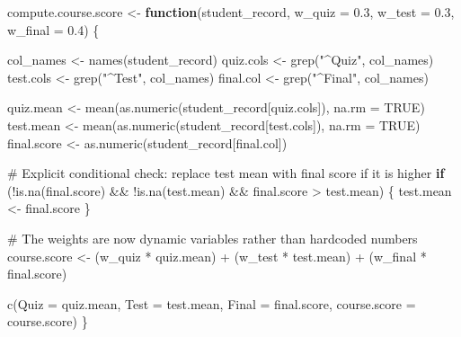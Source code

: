 \documentclass[
  letterpaper,
  DIV=11,
  numbers=noendperiod]{scrreprt}
\newenvironment{Shaded}{\begin{snugshade}}{\end{snugshade}}
\newcommand{\AttributeTok}[1]{\textcolor[rgb]{0.40,0.45,0.13}{#1}}
\newcommand{\CommentTok}[1]{\textcolor[rgb]{0.37,0.37,0.37}{#1}}
\newcommand{\ConstantTok}[1]{\textcolor[rgb]{0.56,0.35,0.01}{#1}}
\newcommand{\ControlFlowTok}[1]{\textcolor[rgb]{0.00,0.23,0.31}{\textbf{#1}}}
\newcommand{\FloatTok}[1]{\textcolor[rgb]{0.68,0.00,0.00}{#1}}
\newcommand{\FunctionTok}[1]{\textcolor[rgb]{0.28,0.35,0.67}{#1}}
\newcommand{\NormalTok}[1]{\textcolor[rgb]{0.00,0.23,0.31}{#1}}
\newcommand{\OtherTok}[1]{\textcolor[rgb]{0.00,0.23,0.31}{#1}}
\newcommand{\SpecialCharTok}[1]{\textcolor[rgb]{0.37,0.37,0.37}{#1}}
\newcommand{\StringTok}[1]{\textcolor[rgb]{0.13,0.47,0.30}{#1}}
\begin{document}
\begin{Shaded}
\begin{Highlighting}[]
\NormalTok{compute.course.score }\OtherTok{\textless{}{-}} \ControlFlowTok{function}\NormalTok{(student\_record, }\AttributeTok{w\_quiz =} \FloatTok{0.3}\NormalTok{, }\AttributeTok{w\_test =} \FloatTok{0.3}\NormalTok{, }\AttributeTok{w\_final =} \FloatTok{0.4}\NormalTok{) \{}
    
\NormalTok{    col\_names }\OtherTok{\textless{}{-}} \FunctionTok{names}\NormalTok{(student\_record)}
\NormalTok{    quiz.cols }\OtherTok{\textless{}{-}} \FunctionTok{grep}\NormalTok{(}\StringTok{"\^{}Quiz"}\NormalTok{, col\_names)}
\NormalTok{    test.cols }\OtherTok{\textless{}{-}} \FunctionTok{grep}\NormalTok{(}\StringTok{"\^{}Test"}\NormalTok{, col\_names)}
\NormalTok{    final.col }\OtherTok{\textless{}{-}} \FunctionTok{grep}\NormalTok{(}\StringTok{"\^{}Final"}\NormalTok{, col\_names)}
    
\NormalTok{    quiz.mean }\OtherTok{\textless{}{-}} \FunctionTok{mean}\NormalTok{(}\FunctionTok{as.numeric}\NormalTok{(student\_record[quiz.cols]), }\AttributeTok{na.rm =} \ConstantTok{TRUE}\NormalTok{)}
\NormalTok{    test.mean }\OtherTok{\textless{}{-}} \FunctionTok{mean}\NormalTok{(}\FunctionTok{as.numeric}\NormalTok{(student\_record[test.cols]), }\AttributeTok{na.rm =} \ConstantTok{TRUE}\NormalTok{)}
\NormalTok{    final.score }\OtherTok{\textless{}{-}} \FunctionTok{as.numeric}\NormalTok{(student\_record[final.col])}
    
    \CommentTok{\# Explicit conditional check: replace test mean with final score if it is higher}
    \ControlFlowTok{if}\NormalTok{ (}\SpecialCharTok{!}\FunctionTok{is.na}\NormalTok{(final.score) }\SpecialCharTok{\&\&} \SpecialCharTok{!}\FunctionTok{is.na}\NormalTok{(test.mean) }\SpecialCharTok{\&\&}\NormalTok{ final.score }\SpecialCharTok{\textgreater{}}\NormalTok{ test.mean) \{}
\NormalTok{        test.mean }\OtherTok{\textless{}{-}}\NormalTok{ final.score}
\NormalTok{    \}}
    
    \CommentTok{\# The weights are now dynamic variables rather than hardcoded numbers}
\NormalTok{    course.score }\OtherTok{\textless{}{-}}\NormalTok{ (w\_quiz }\SpecialCharTok{*}\NormalTok{ quiz.mean) }\SpecialCharTok{+}\NormalTok{ (w\_test }\SpecialCharTok{*}\NormalTok{ test.mean) }\SpecialCharTok{+}\NormalTok{ (w\_final }\SpecialCharTok{*}\NormalTok{ final.score)}
    
    \FunctionTok{c}\NormalTok{(}\AttributeTok{Quiz =}\NormalTok{ quiz.mean, }\AttributeTok{Test =}\NormalTok{ test.mean, }\AttributeTok{Final =}\NormalTok{ final.score, }\AttributeTok{course.score =}\NormalTok{ course.score)}
\NormalTok{\}}
\end{Highlighting}
\end{Shaded}
\end{document}
